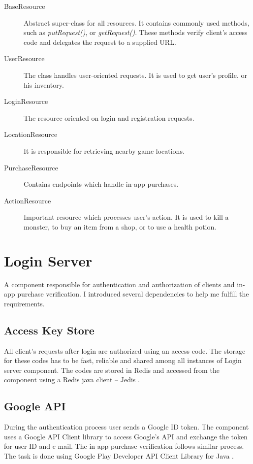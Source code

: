 \begin{description}	
	\item[BaseResource] Abstract super-class for all resources. It contains commonly used methods, such as \textit{putRequest()}, or \textit{getRequest()}. These methods verify client's access code and delegates the request to a supplied URL.
	
	\item[UserResource] The class handles user-oriented requests. It is used to get user's profile, or his inventory.
	
	\item[LoginResource] The resource oriented on login and registration requests.
	
	\item[LocationResource] It is responsible for retrieving nearby game locations.
	
	\item[PurchaseResource] Contains endpoints which handle in-app purchases.

	\item[ActionResource] Important resource which processes user's action. It is used to kill a monster, to buy an item from a shop, or to use a health potion.
\end{description}

\section{Login Server}
A component responsible for authentication and authorization of clients and in-app purchase verification. I introduced several dependencies to help me fulfill the requirements.
 
\subsection{Access Key Store}
All client's requests after login are authorized using an access code. The storage for these codes has to be fast, reliable and shared among all instances of Login server component. The codes are stored in Redis and accessed from the component using a Redis java client -- Jedis \cite{jedis}. 

\subsection{Google API}
During the authentication process user sends a Google ID token. The component uses a Google API Client library \cite{googleapilibs} to access Google's API and exchange the token for user ID and e-mail. The in-app purchase verification follows similar process. The task is done using Google Play Developer API Client Library for Java  \cite{androidpublisherlibary}.

